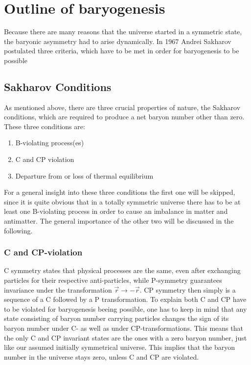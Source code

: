 \chapter{Outline of baryogenesis}
Because there are many reasons that the universe started in a symmetric state, the baryonic asymmetry had to arise dynamically.\newline\indent
In 1967 Andrei Sakharov postulated three criteria, which have to be met in order for baryogenesis to be possible 
\section{Sakharov Conditions}
As mentioned above, there are three crucial properties of nature, the Sakharov conditions, which are required to produce a net baryon number other than zero. These three conditions are:
\begin{enumerate}
	\item B-violating process(es)
	\item C and CP violation
	\item Departure from or loss of thermal equilibrium
\end{enumerate}
For a general insight into these three conditions the first one will be skipped, since it is quite obvious that in a totally symmetric universe there has to be at least one B-violating process in order to cause an imbalance in matter and antimatter. The general importance of the other two will be discussed in the following.
\subsection{C and CP-violation}
C symmetry states that physical processes are the same, even after exchanging particles for their respective anti-particles, while P-symmetry guarantees invariance under the transformation $\vec{r}\rightarrow-\vec{r}$. CP symmetry then simply is a sequence of a C followed by a P transformation. \newline\indent \indent
To explain both C and CP have to be violated for baryogenesis beeing possible, one has to keep in mind that any state consisting of baryon number carrying particles changes the sign of its baryon number under C- as well as under CP-transformations\cite[p. 4]{Petropoulos:2003pm}. This means that the only C and CP invariant states are the ones with a zero baryon number, just like our assumed initially symmetrical universe.
This implies that the baryon number in the universe stays zero, unless C and CP are violated\cite[p. 4]{Petropoulos:2003pm}. \newline \indent
